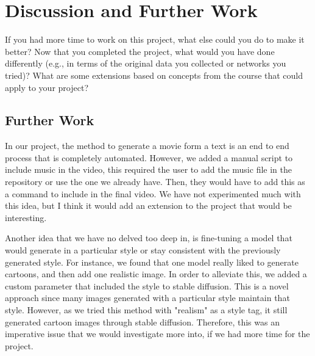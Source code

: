 \documentclass[conference]{IEEEtran}
\begin{document}


\section{Discussion and Further Work}

\begin{tcolorbox}
If you had more time to work on this project, what else could you do
to make it better? Now that you completed the project, what would you have done differently (e.g., in terms of the original data you collected or networks you tried)? What are some extensions based on concepts from the course that could apply to your project?
\end{tcolorbox}

\subsection{Further Work}
In our project, the method to generate a movie form a text is an end to end process that is completely automated. However, we added a manual script to include music in the video, this required the user to add the music file in the repository or use the one we already have. Then, they would have to add this as a command to include in the final video. We have not experimented much with this idea, but I think it would add an extension to the project that would be interesting. 

Another idea that we have no delved too deep in, is fine-tuning a model that would generate in a particular style or stay consistent with the previously generated style. For instance, we found that one model really liked to generate cartoons, and then add one realistic image. In order to alleviate this, we added a custom parameter that included the style to stable diffusion. This is a novel approach since many images generated with a particular style maintain that style. However, as we tried this method with "realism" as a style tag, it still generated cartoon images through stable diffusion. Therefore, this was an imperative issue that we would investigate more into, if we had more time for the project. 
\end{document}
